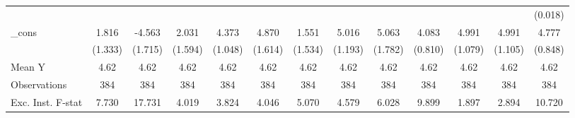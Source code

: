 {\begin{tabular}{l*{12}{c}}
            &                     &                     &                     &                     &                     &                     &                     &                     &                     &                     &                     &     (0.018)         \\
\addlinespace
\_cons      &       1.816         &      -4.563\sym{**} &       2.031         &       4.373\sym{***}&       4.870\sym{***}&       1.551         &       5.016\sym{***}&       5.063\sym{***}&       4.083\sym{***}&       4.991\sym{***}&       4.991\sym{***}&       4.777\sym{***}\\
            &     (1.333)         &     (1.715)         &     (1.594)         &     (1.048)         &     (1.614)         &     (1.534)         &     (1.193)         &     (1.782)         &     (0.810)         &     (1.079)         &     (1.105)         &     (0.848)         \\
\midrule
Mean Y      &        4.62         &        4.62         &        4.62         &        4.62         &        4.62         &        4.62         &        4.62         &        4.62         &        4.62         &        4.62         &        4.62         &        4.62         \\
Observations&         384         &         384         &         384         &         384         &         384         &         384         &         384         &         384         &         384         &         384         &         384         &         384         \\
Exc. Inst. F-stat&       7.730         &      17.731         &       4.019         &       3.824         &       4.046         &       5.070         &       4.579         &       6.028         &       9.899         &       1.897         &       2.894         &      10.720         \\
\bottomrule
\end{tabular}
}
